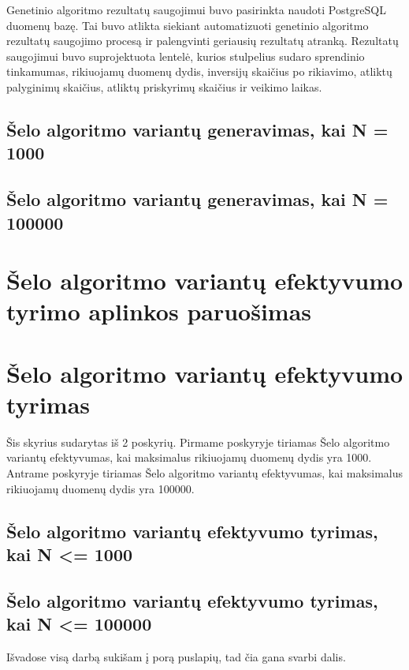 \documentclass{VUMIFInfKursinis}
\begin{document}
Genetinio algoritmo rezultatų saugojimui buvo pasirinkta naudoti PostgreSQL duomenų bazę.
Tai buvo atlikta siekiant automatizuoti genetinio algoritmo rezultatų saugojimo procesą ir palengvinti geriausių rezultatų atranką.
Rezultatų saugojimui buvo suprojektuota lentelė, kurios stulpelius sudaro sprendinio tinkamumas, rikiuojamų duomenų dydis,
inversijų skaičius po rikiavimo, atliktų palyginimų skaičius, atliktų priskyrimų skaičius ir veikimo laikas.  


\subsection{Šelo algoritmo variantų generavimas, kai N = 1000}

\subsection{Šelo algoritmo variantų generavimas, kai N = 100000}

\section{Šelo algoritmo variantų efektyvumo tyrimo aplinkos paruošimas}



\section{Šelo algoritmo variantų efektyvumo tyrimas}

Šis skyrius sudarytas iš 2 poskyrių.
Pirmame poskyryje tiriamas Šelo algoritmo variantų efektyvumas, kai maksimalus rikiuojamų duomenų dydis yra 1000.
Antrame poskyryje tiriamas Šelo algoritmo variantų efektyvumas, kai maksimalus rikiuojamų duomenų dydis yra 100000.

\subsection{Šelo algoritmo variantų efektyvumo tyrimas, kai N <= 1000}


\subsection{Šelo algoritmo variantų efektyvumo tyrimas, kai N <= 100000}



Išvadose visą darbą sukišam į porą puslapių, tad čia gana svarbi dalis.
\end{document}
